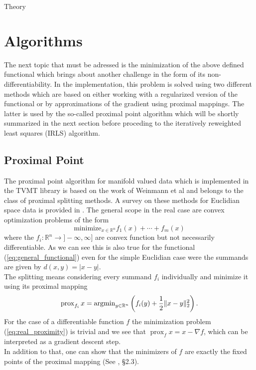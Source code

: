 \begin{chapter}{Theory}
\section{Algorithms} %
\label{sec:Algorithms}
The next topic that must be adressed is the minimization of the above defined functional which brings about another challenge in the form of its non-differentiability.
In the implementation, this problem is solved using two different methods which are based on either working with a regularized version of the functional or by approximations of the gradient
using proximal mappings. The latter is used by the so-called proximal point algorithm which will be shortly summarized in the next section before proceding to
the iteratively reweighted least squares (IRLS) algorithm.


\subsection{Proximal Point} %
\label{sub:ProximalPoint}
The proximal point algorithm for manifold valued data which is implemented in the TVMT library is based on the work of Weinmann et al\cite{Weinmann} and belongs to the class
of proximal splitting methods. A survey on these methods for Euclidian space data is provided in \cite{CombettesPequet}. The general scope in the real case are convex
optimization problems of the form
\begin{equation}
    \text{minimize}_{x\in \mathbb{R}^n} f_1(x) + \cdots +f_m(x)
\end{equation}
where the $f_i:\mathbb{R}^n\to]-\infty,\infty]$ are convex function but not necessarily differentiable. As we can see this is also true for the functional (\ref{eq:general_functional})
even for the simple Euclidian case were the summands are given by $d(x,y)=|x-y|$. \\
The splitting means considering every summand $f_i$ individually and minimize it using its proximal mapping
\begin{equation}
    \label{eq:real_proximity}
    \operatorname{prox}_{f_i}x=\operatorname{argmin}_{y\in\mathbb{R}^n}\left(f_i(y) + \frac{1}{2}\| x-y \|^2_{2} \right).
\end{equation}
For the case of a differentiable function $f$ the minimization problem (\ref{eq:real_proximity}) is trivial and we see that $\operatorname{prox}_f x = x-\nabla f$, which 
can be interpreted as a gradient descent step.\\
In addition to that, one can show that the minimizers of $f$ are exactly the fixed points of the proximal mapping (See \cite{ParikhBoyd}, \S 2.3).


\end{chapter}

